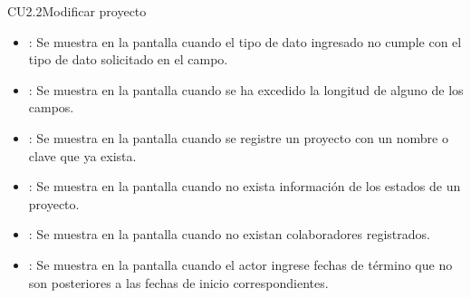 \begin{UseCase}{CU2.2}{Modificar proyecto}
{\begin{itemize}
		\item {}: Se muestra en la pantalla  cuando el tipo de dato ingresado no cumple con el tipo de dato solicitado en
		el campo.
		\item {}: Se muestra en la pantalla  cuando se ha excedido la longitud de alguno de los campos.
		\item {}: Se muestra en la pantalla  cuando se registre un proyecto con un nombre o clave que ya exista.
		\item {}: Se muestra en la pantalla  cuando no exista información de los estados de un proyecto.
		\item {}: Se muestra en la pantalla  cuando no existan colaboradores registrados.
		\item {}: Se muestra en la pantalla  cuando el actor ingrese fechas de término que no son posteriores a las fechas
		de inicio correspondientes.
		\end{itemize}
		}
	\end{UseCase}
